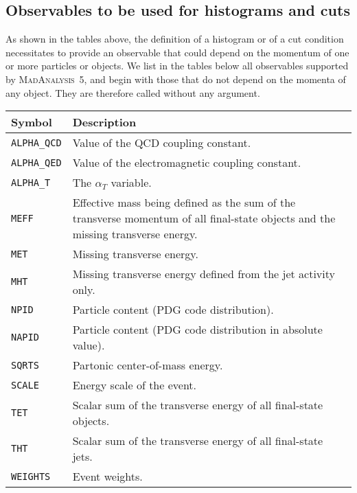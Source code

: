\documentclass[a4paper]{article}
\newcommand{\MA}{\textsc{MadAnalysis}~5}
\begin{document}
\begin{shaded}
\section{\Large Observables to be used for histograms and cuts}
\label{sec:obs}
\end{shaded}


As shown in the tables above, the definition of a histogram or of a cut
condition necessitates to provide an observable that could depend on the momentum
of one or more particles or objects. We list in the tables below all observables
supported by \MA, and begin with those that do not depend on the momenta of any
object. They are therefore called without any argument.\\
\renewcommand{\arraystretch}{1.2}%
\begin{center}\begin{tabular}{l p{10.2cm}}
\hline
Symbol& Description\\
\hline
\color{ao} \verb?ALPHA_QCD? & Value of the QCD coupling constant.\\
\color{ao} \verb?ALPHA_QED? & Value of the electromagnetic coupling constant.\\
\color{ao} \verb?ALPHA_T?   & The $\alpha_T$ variable\cite{Randall:2008rw}.\\
\color{ao} \verb?MEFF?      & Effective mass being defined as the sum of the transverse
                   momentum of all final-state objects and the missing
                   transverse energy.\\
\color{ao} \verb?MET?       & Missing transverse energy.\\
\color{ao} \verb?MHT?       & Missing transverse energy defined from the jet activity
                   only.\\
\color{ao} \verb?NPID?      & Particle content (PDG code distribution).\\
\color{ao} \verb?NAPID?     & Particle content (PDG code distribution in
                   absolute value).\\
\color{ao} \verb?SQRTS?     & Partonic center-of-mass energy.\\
\color{ao} \verb?SCALE?     & Energy scale of the event.\\
\color{ao} \verb?TET?       & Scalar sum of the transverse energy of all final-state
                   objects.\\
\color{ao} \verb?THT?       & Scalar sum of the transverse energy of all final-state
                   jets.\\
\color{ao} \verb?WEIGHTS?   & Event weights.\\
\hline
\end{tabular}
\end{center}
\end{document}
